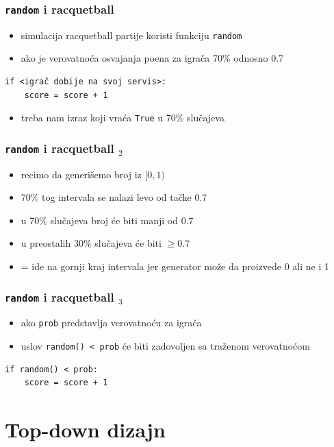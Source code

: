 \documentclass[utf8,compress,aspectratio=169]{beamer}
\begin{document}
\begin{frame}[fragile]
  \frametitle{\texttt{random} i racquetball}
  \begin{itemize}
    \item simulacija racquetball partije koristi funkciju \texttt{random}
    \item ako je verovatnoća osvajanja poena za igrača 70\% odnosno 0.7
  \end{itemize}
\begin{verbatim}
if <igrač dobije na svoj servis>:
    score = score + 1
\end{verbatim}
  \begin{itemize}
    \item treba nam izraz koji vraća \texttt{True} u 70\% slučajeva
  \end{itemize}
\end{frame}

\begin{frame}
  \frametitle{\texttt{random} i racquetball $_2$}
  \begin{itemize}
    \item recimo da generišemo broj iz $[0,1)$
    \item 70\% tog intervala se nalazi levo od tačke 0.7
    \item u 70\% slučajeva broj će biti manji od 0.7
    \item u preostalih 30\% slučajeva će biti $\geq 0.7$
    \item = ide na gornji kraj intervala jer generator može da proizvede 0 ali ne i 1
  \end{itemize}
\end{frame}

\begin{frame}[fragile]
  \frametitle{\texttt{random} i racquetball $_3$}
  \begin{itemize}
    \item ako \texttt{prob} predstavlja verovatnoću za igrača
    \item uslov \texttt{random() < prob} će biti zadovoljen sa traženom verovatnoćom
  \end{itemize}
\begin{verbatim}
if random() < prob:
    score = score + 1
\end{verbatim}
\end{frame}

\section[Top-down]{Top-down dizajn}
\end{document}
